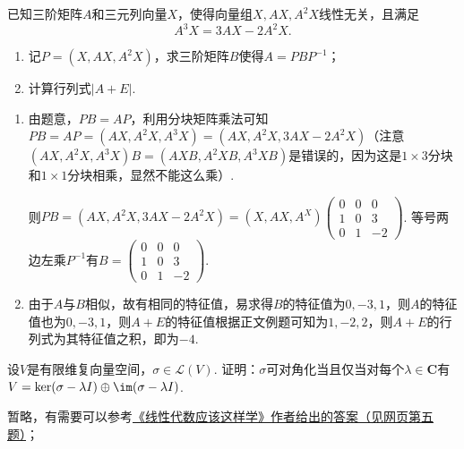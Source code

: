 \begin{exercise}
\begin{exgroup}
        \item 已知三阶矩阵$A$和三元列向量$X$，使得向量组$X,AX,A^2X$线性无关，且满足
        \[A^3X=3AX-2A^2X.\]
        \begin{enumerate}
            \item 记$P=(X,AX,A^2X)$，求三阶矩阵$B$使得$A=PBP^{-1}$；

            \item 计算行列式$|A+E|$.
        \end{enumerate}
        \begin{answer}
            \begin{enumerate}
              \item 由题意，$PB=AP$，利用分块矩阵乘法可知$PB=AP=(AX,A^2X,A^3X)=(AX,A^2X,3AX-2A^2X)$（注意$(AX,A^2X,A^3X)B=(AXB,A^2XB,A^3XB)$是错误的，因为这是$1\times 3$分块和$1\times 1$分块相乘，显然不能这么乘）.

                    则$PB=(AX,A^2X,3AX-2A^2X)=(X,AX,A^X)\begin{pmatrix}
                            0 & 0 & 0 \\ 1 & 0 & 3 \\ 0 & 1 & -2
                        \end{pmatrix}$. 等号两边左乘$P^{-1}$有$B=\begin{pmatrix}
                            0 & 0 & 0 \\ 1 & 0 & 3 \\ 0 & 1 & -2
                        \end{pmatrix}$.

              \item 由于$A$与$B$相似，故有相同的特征值，易求得$B$的特征值为$0,-3,1$，则$A$的特征值也为$0,-3,1$，则$A+E$的特征值根据正文例题可知为$1,-2,2$，则$A+E$的行列式为其特征值之积，即为$-4$.
          \end{enumerate}
        \end{answer}
    \end{exgroup}

    \begin{exgroup}
        \item 设$V$是有限维复向量空间，$\sigma\in \mathcal{L}(V)$. 证明：$\sigma$可对角化当且仅当对每个$\lambda\in\mathbf{C}$有$V=\ker(\sigma-\lambda I)\oplus\im(\sigma-\lambda I)$.
        \begin{answer}
            暂略，有需要可以参考\href{https://linearalgebras.com/5c.html}{《线性代数应该这样学》作者给出的答案（见网页第五题）}；
        \end{answer}


\end{exgroup}
\end{exercise}
